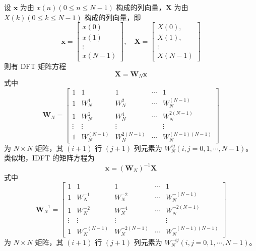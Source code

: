 \documentclass[12pt,AutoFakeBold]{article}
\begin{document}
设 $\boldsymbol{x}$ 为由 $x(n)(0\le n\le N-1)$ 构成的列向量，$\boldsymbol{X}$ 为由 $X(k)(0\le k\le N-1)$ 构成的列向量，即
%
\begin{equation*}
\boldsymbol{x}=\begin{bmatrix}
x(0) \\
x(1) \\
\vdots \\
x(N-1)
\end{bmatrix}
,\quad
\boldsymbol{X}=\begin{bmatrix}
X(0), \\
X(1), \\
\vdots \\
X(N-1)
\end{bmatrix}
\end{equation*}
%
则有 DFT 矩阵方程
%
\begin{equation*}
\boldsymbol{X}=\boldsymbol{W}_N\boldsymbol{x}
\end{equation*}
%
式中
%
\begin{equation*}
\boldsymbol{W}_N=\begin{bmatrix}
1 & 1 & 1 & \cdots & 1 \\
1 & W_N^1 & W_N^2 & \cdots & W_N^{(N-1)} \\
1 & W_N^2 & W_N^4 & \cdots & W_N^{2(N-1)} \\
\vdots & \vdots & \vdots & & \vdots \\
1 & W_N^{(N-1)} & W_N^{2(N-1)} & \cdots & W_N^{(N-1)(N-1)}
\end{bmatrix}
\end{equation*}
%
为 $N\times N$ 矩阵，其 $(i+1)$ 行 $(j+1)$ 列元素为 $W_N^{ij}(i,j=0,1,\cdots,N-1)$。类似地，IDFT 的矩阵方程为
%
\begin{equation*}
\boldsymbol{x}=(\boldsymbol{W}_N)^{-1}\boldsymbol{X}
\end{equation*}
%
式中
%
\begin{equation*}
\boldsymbol{W}_N^{-1}=\begin{bmatrix}
1 & 1 & 1 & \cdots & 1 \\
1 & W_N^{-1} & W_N^{-2} & \cdots & W_N^{-(N-1)} \\
1 & W_N^{-2} & W_N^{-4} & \cdots & W_N^{-2(N-1)} \\
\vdots & \vdots & \vdots & & \vdots \\
1 & W_N^{-(N-1)} & W_N^{-2(N-1)} & \cdots & W_N^{-(N-1)(N-1)}
\end{bmatrix}
\end{equation*}
%
为 $N\times N$ 矩阵，其 $(i+1)$ 行 $(j+1)$ 列元素为 $W_N^{-ij}(i,j=0,1,\cdots,N-1)$。
\end{document}
